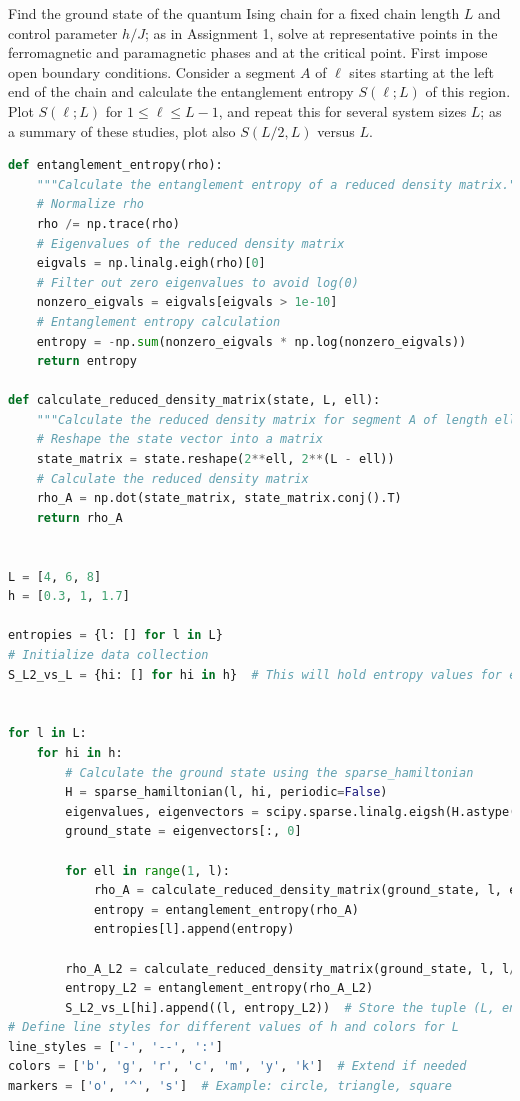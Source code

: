 \documentclass[12pt]{article}
\begin{document}
Find the ground state of the quantum Ising chain for a fixed chain length $L$ and control parameter $h / J$; as in Assignment 1, solve at representative points in the ferromagnetic and paramagnetic phases and at the critical point. First impose open boundary conditions. Consider a segment $A$ of $\ell$ sites starting at the left end of the chain and calculate the entanglement entropy $S(\ell ; L)$ of this region. Plot $S(\ell ; L)$ for $1 \leq \ell \leq L-1$, and repeat this for several system sizes $L$; as a summary of these studies, plot also $S(L / 2, L)$ versus $L$.
\newpage
\begin{lstlisting}[language=Python]
def entanglement_entropy(rho):
    """Calculate the entanglement entropy of a reduced density matrix."""
    # Normalize rho
    rho /= np.trace(rho)
    # Eigenvalues of the reduced density matrix
    eigvals = np.linalg.eigh(rho)[0]
    # Filter out zero eigenvalues to avoid log(0)
    nonzero_eigvals = eigvals[eigvals > 1e-10]
    # Entanglement entropy calculation
    entropy = -np.sum(nonzero_eigvals * np.log(nonzero_eigvals))
    return entropy

def calculate_reduced_density_matrix(state, L, ell):
    """Calculate the reduced density matrix for segment A of length ell."""
    # Reshape the state vector into a matrix
    state_matrix = state.reshape(2**ell, 2**(L - ell))
    # Calculate the reduced density matrix
    rho_A = np.dot(state_matrix, state_matrix.conj().T)
    return rho_A


L = [4, 6, 8]
h = [0.3, 1, 1.7]

entropies = {l: [] for l in L}
# Initialize data collection
S_L2_vs_L = {hi: [] for hi in h}  # This will hold entropy values for each h across all L


for l in L:
    for hi in h:
        # Calculate the ground state using the sparse_hamiltonian
        H = sparse_hamiltonian(l, hi, periodic=False)
        eigenvalues, eigenvectors = scipy.sparse.linalg.eigsh(H.astype(np.float64), k=1, which='SA')
        ground_state = eigenvectors[:, 0]
        
        for ell in range(1, l):
            rho_A = calculate_reduced_density_matrix(ground_state, l, ell)
            entropy = entanglement_entropy(rho_A)
            entropies[l].append(entropy)
        
        rho_A_L2 = calculate_reduced_density_matrix(ground_state, l, l//2)
        entropy_L2 = entanglement_entropy(rho_A_L2)
        S_L2_vs_L[hi].append((l, entropy_L2))  # Store the tuple (L, entropy)
# Define line styles for different values of h and colors for L
line_styles = ['-', '--', ':']
colors = ['b', 'g', 'r', 'c', 'm', 'y', 'k']  # Extend if needed
markers = ['o', '^', 's']  # Example: circle, triangle, square


\end{lstlisting}
\end{document}
